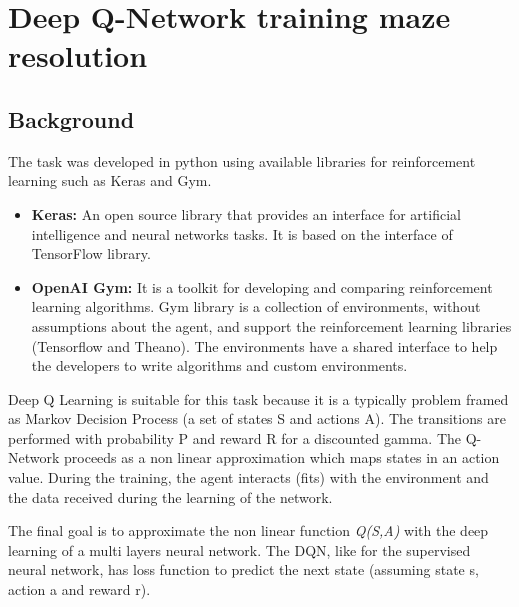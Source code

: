 \section{Deep Q-Network training maze resolution}
\subsection{Background}
The task was developed in python using available libraries for reinforcement learning such as Keras and Gym.
\begin{itemize}
    \item \textbf{Keras: }An open source library that provides an interface for artificial intelligence and neural networks tasks. It is based on the interface of TensorFlow library.
    \item \textbf{OpenAI Gym: }It is a toolkit for developing and comparing reinforcement learning algorithms. Gym library is a collection of environments, without assumptions about the agent, and support the reinforcement learning libraries (Tensorflow and Theano). The environments have a shared interface to help the developers to write algorithms and custom environments.
\end{itemize}

Deep Q Learning is suitable for this task because it is a typically problem framed as Markov Decision Process (a set of states S and actions A). The transitions are performed with probability P and reward R for a discounted gamma. 
The Q-Network proceeds as a non linear approximation which maps states in an action value. During the training, the agent interacts (fits) with the environment and the data received during the learning of the network.

The final goal is to approximate the non linear function \textit{Q(S,A)} with the deep learning of a multi layers neural network. The DQN, like for the supervised neural network, has loss function to predict the next state (assuming state s, action a and reward r).

